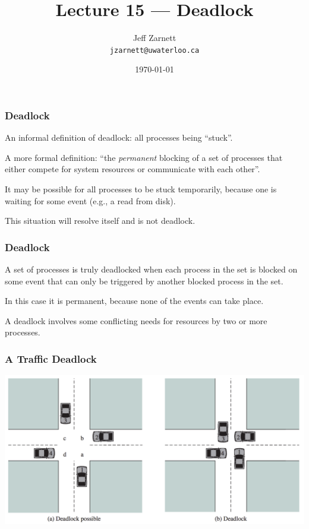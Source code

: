 

\title{Lecture 15 --- Deadlock }

\author{Jeff Zarnett \\ \small \texttt{jzarnett@uwaterloo.ca}}
\date{\today}




\begin{frame}
  \titlepage

 \end{frame}

\begin{frame}
\frametitle{Deadlock}

An informal definition of deadlock: all processes being ``stuck''. 

A more formal definition: ``the \textit{permanent} blocking of a set of processes that either compete for system resources or communicate with each other''.

It may be possible for all processes to be stuck temporarily, because one is waiting for some event (e.g., a read from disk).

This situation will resolve itself and is not deadlock. 

\end{frame}


\begin{frame}
\frametitle{Deadlock}
 A set of processes is truly deadlocked when each process in the set is blocked on some event that can only be triggered by another blocked process in the set. 
 
 In this case it is permanent, because none of the events can take place.

A deadlock involves some conflicting needs for resources by two or more processes. 

\end{frame}

\begin{frame}
\frametitle{A Traffic Deadlock}

\begin{center}
\includegraphics[width=\textwidth]{images/car-deadlock.png}
\end{center}


\end{frame}


